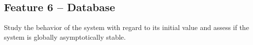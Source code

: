 \documentclass[a4paper]{article} %
\begin{document}
	\subsection*{Feature 6 -- Database}
	\label{task1:feature6}
	
	Study the behavior of the system with regard to its initial value and assess if the system is globally asymptotically stable.
	
	
	
	
	
	
	
	\clearpage %
	
\end{document}
